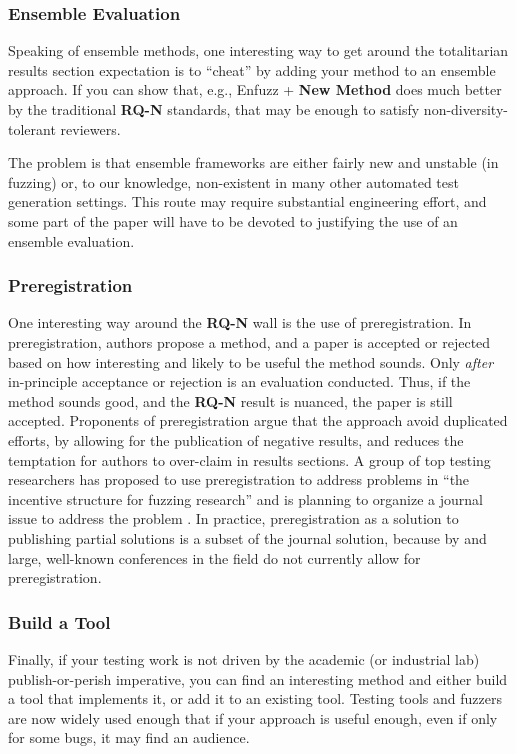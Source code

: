 \documentclass[sigplan,screen]{acmart}
\begin{document}
\subsubsection{Ensemble Evaluation}

Speaking of ensemble methods, one interesting way to get around the totalitarian results section
expectation is to ``cheat'' by adding your method to an ensemble
approach.  If you can show that, e.g., Enfuzz + {\bf New Method} does much
better by the traditional {\bf RQ-N} standards, that may be enough to
satisfy non-diversity-tolerant reviewers.

The problem is that ensemble frameworks are either fairly new and
unstable (in fuzzing) or, to our knowledge, non-existent in many other
automated test generation settings.  This route may require
substantial engineering effort, and some part of the paper will have
to be devoted to justifying the use of an ensemble evaluation.

\subsubsection{Preregistration}

One interesting way around the {\bf RQ-N} wall is the use of
preregistration.  In preregistration, authors propose a method, and
a paper is accepted or rejected based on how interesting and likely to
be useful the method sounds.  Only \emph{after} in-principle
acceptance or rejection is an evaluation conducted.  Thus, if the
method sounds good, and the {\bf RQ-N} result is nuanced, the paper is
still accepted.  Proponents of preregistration argue that the approach
avoid duplicated efforts, by allowing for the publication of negative
results, and reduces the temptation for authors to over-claim in
results sections.  A group of top testing researchers has proposed to
use preregistration to address problems in ``the incentive structure
for fuzzing research'' and is planning to organize a journal issue to
address the problem \cite{special}.  In practice, preregistration as a solution to
publishing partial solutions is a subset of the journal solution,
because by and large, well-known conferences in the field do not currently allow
for preregistration.


\subsubsection{Build a Tool}

Finally, if your testing work is not driven by the academic (or
industrial lab) publish-or-perish imperative, you can find an
interesting method and either build a tool that implements it, or add
it to an existing tool.  Testing tools and fuzzers are now widely used
enough that if your approach is useful enough, even if only for some
bugs, it may find an audience.
\end{document}
